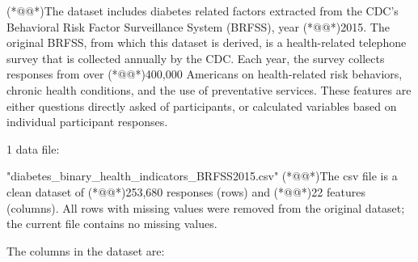 \documentclass[11pt]{article}
\begin{document}
\begin{codeoutput}
(*@@*)The dataset includes diabetes related factors extracted from the CDC's Behavioral Risk Factor Surveillance System (BRFSS), year (*@@*)2015.
The original BRFSS, from which this dataset is derived, is a health-related telephone survey that is collected annually by the CDC.
Each year, the survey collects responses from over (*@@*)400,000 Americans on health-related risk behaviors, chronic health conditions, and the use of preventative services. These features are either questions directly asked of participants, or calculated variables based on individual participant responses.


1 data file:

"diabetes\_binary\_health\_indicators\_BRFSS2015.csv"
(*@@*)The csv file is a clean dataset of (*@@*)253,680 responses (rows) and (*@@*)22 features (columns).
All rows with missing values were removed from the original dataset; the current file contains no missing values.

The columns in the dataset are:


\end{codeoutput}
\end{document}
